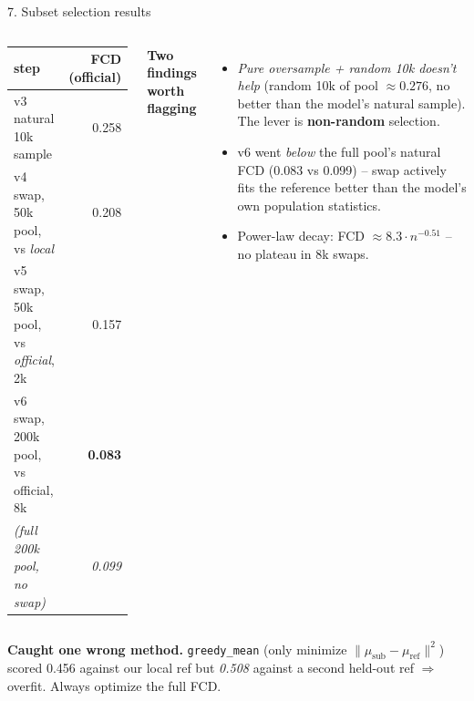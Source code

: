 \documentclass[aspectratio=169,11pt]{beamer}
\begin{document}
\begin{frame}{7. Subset selection results}
  \begin{columns}[T,onlytextwidth]
    \centering
    \footnotesize
    \begin{tabular}{lr}
      \toprule
      step & FCD (official) \\
      \midrule
      v3 natural 10k sample              & 0.258 \\
      v4 swap, 50k pool, vs \emph{local} & 0.208 \\
      v5 swap, 50k pool, vs \emph{official}, 2k & 0.157 \\
      v6 swap, 200k pool, vs official, 8k & \textbf{0.083} \\
      \midrule
      \emph{(full 200k pool, no swap)}   & \emph{0.099} \\
      \bottomrule
    \end{tabular}

    \textbf{Two findings worth flagging}
    \begin{itemize}
      \item \emph{Pure oversample + random 10k doesn't help}
        (random 10k of pool $\approx 0.276$, no better than the model's natural sample).
        The lever is \textbf{non-random} selection.
      \item v6 went \emph{below} the full pool's natural FCD (0.083 vs 0.099) -- swap
        actively fits the reference better than the model's own population statistics.
      \item Power-law decay: FCD $\approx 8.3 \cdot n^{-0.51}$
        -- no plateau in 8k swaps.
    \end{itemize}
  \end{columns}

  \medskip
  \textbf{Caught one wrong method.}
  \texttt{greedy\_mean} (only minimize $\|\mu_{\mathrm{sub}}-\mu_{\mathrm{ref}}\|^2$)
  scored 0.456 against our local ref but \emph{0.508} against a second held-out ref
  $\Rightarrow$ overfit. Always optimize the full FCD.
\end{frame}
\end{document}

